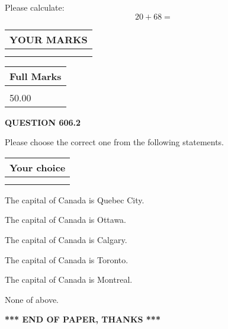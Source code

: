 \documentclass[12pt]{article}
\begin{document}
  
 
Please calculate:
\begin{equation}
20 +  %
68 = \nonumber
\end{equation}
 

 

 
  
\vspace{0.2in}
  
\noindent\begin{tabular}{|l|}
\hline
 YOUR MARKS  \\
\hline
 \\ 
 \\ 
\hline
\end{tabular}
\hspace{0.05in} \begin{tabular}{|l|}
\hline
 Full Marks  \\
\hline
 \\ 
50.00 \\
\hline
\end{tabular}
{\textbf{\Large{QUESTION
606.2 
}}}
  
  
Please choose the correct one from the following statements.
  
  
\noindent\hspace{3.0in} \begin{tabular}{|l|}
\hline
Your choice \\
\hline
 \\ 
 \\ 
\hline
\end{tabular}
  
  
 
 
The capital of Canada is Quebec City.
 
 
The capital of Canada is Ottawa.
 
 
The capital of Canada is Calgary.
 
 
The capital of Canada is Toronto.
 
 
The capital of Canada is Montreal.
 
 
 None of above.
 
 
   
   
 \vspace{0.2in}
 
   
   
   
   
\vspace{1.0in} 
{\textbf{\large{ *** END OF PAPER, THANKS *** }}} 
   
\end{document}
